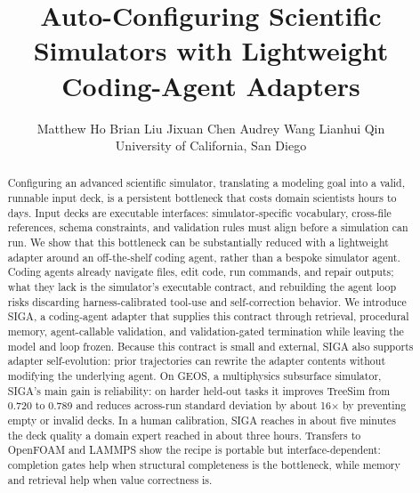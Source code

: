 \documentclass{article}
\title{Auto-Configuring Scientific Simulators with Lightweight Coding-Agent Adapters}
\author{%
  Matthew Ho \quad Brian Liu \quad Jixuan Chen \quad Audrey Wang \quad Lianhui Qin \\[3pt]
  University of California, San Diego
}
\begin{document}
\maketitle


\begin{abstract}
Configuring an advanced scientific simulator, translating a modeling goal into a valid, runnable input deck, is a persistent bottleneck that costs domain scientists hours to days. Input decks are executable interfaces: simulator-specific vocabulary, cross-file references, schema constraints, and validation rules must align before a simulation can run. We show that this bottleneck can be substantially reduced with a lightweight adapter around an off-the-shelf coding agent, rather than a bespoke simulator agent. Coding agents already navigate files, edit code, run commands, and repair outputs; what they lack is the simulator’s executable contract, and rebuilding the agent loop risks discarding harness-calibrated tool-use and self-correction behavior. We introduce SIGA, a coding-agent adapter that supplies this contract through retrieval, procedural memory, agent-callable validation, and validation-gated termination while leaving the model and loop frozen. Because this contract is small and external, SIGA also supports adapter self-evolution: prior trajectories can rewrite the adapter contents without modifying the underlying agent. On GEOS, a multiphysics subsurface simulator, SIGA’s main gain is reliability: on harder held-out tasks it improves TreeSim from 0.720 to 0.789 and reduces across-run standard deviation by about 16× by preventing empty or invalid decks. In a human calibration, SIGA reaches in about five minutes the deck quality a domain expert reached in about three hours. Transfers to OpenFOAM and LAMMPS show the recipe is portable but interface-dependent: completion gates help when structural completeness is the bottleneck, while memory and retrieval help when value correctness is.

\end{abstract}
\end{document}
